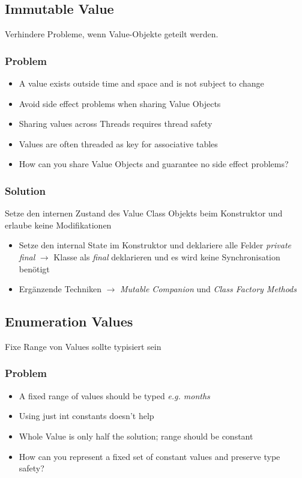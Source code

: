 \subsection{Immutable Value}

Verhindere Probleme, wenn Value-Objekte geteilt werden.

\subsubsection{Problem}
\begin{itemize}
    \item A value exists outside time and space and is not subject to change
    \item Avoid side effect problems when sharing Value Objects
    \item Sharing values across Threads requires thread safety
    \item Values are often threaded as key for associative tables
    \item How can you share Value Objects and guarantee no side effect problems?
\end{itemize}
\subsubsection{Solution}
Setze den internen Zustand des Value Class Objekts beim Konstruktor und erlaube keine Modifikationen

\begin{itemize}
    \item Setze den internal State im Konstruktor und deklariere alle Felder \textit{private final} $\rightarrow$ Klasse als \textit{final} deklarieren und es wird keine Synchronisation benötigt
    \item Ergänzende Techniken $\rightarrow$ \textit{Mutable Companion} und \textit{Class Factory Methods}
\end{itemize}

\subsection{Enumeration Values}
Fixe Range von Values sollte typisiert sein

\subsubsection{Problem}
\begin{itemize}
    \item A fixed range of values should be typed \textit{e.g. months}
    \item Using just int constants doesn't help
    \item Whole Value is only half the solution; range should be constant
    \item How can you represent a fixed set of constant values and preserve type safety?
\end{itemize}
